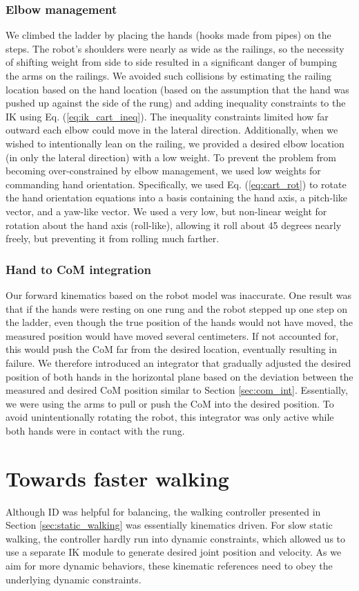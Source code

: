\documentclass{ws-ijhr}
\newcommand{\eref}[1] {Eq. (\ref{#1})}
\newcommand{\sref}[1] {Section \ref{#1}}
\begin{document}
\subsubsection{Elbow management}
We climbed the ladder by placing the hands (hooks made from pipes) on the steps.
The robot's shoulders were nearly as wide as the railings, so the necessity of 
shifting weight from side to side resulted in a significant danger of bumping 
the arms on the railings. 
We avoided such collisions by estimating the railing location based on the hand
location (based on the assumption that the hand was pushed up against the side
of the rung) and adding inequality constraints to the IK using \eref{eq:ik_cart_ineq}. 
The inequality constraints limited how far outward each elbow could move in the 
lateral direction. 
Additionally, when we wished to intentionally lean on the railing, we provided 
a desired elbow location (in only the lateral direction) with a low weight. 
To prevent the problem from becoming over-constrained by elbow management, we 
used low weights for commanding hand orientation. 
Specifically, we used \eref{eq:cart_rot} to rotate the hand orientation equations
into a basis containing the hand axis, a pitch-like vector, and a yaw-like vector.
We used a very low, but non-linear weight for rotation about the hand axis 
(roll-like), allowing it roll about 45 degrees nearly freely, but preventing it 
from rolling much farther.

\subsubsection{Hand to CoM integration}
Our forward kinematics based on the robot model was inaccurate. 
One result was that if the hands were resting on one rung and the robot stepped
up one step on the ladder, even though the true position of the hands would not
have moved, the measured position would have moved several centimeters. 
If not accounted for, this would push the CoM far from the desired location, 
eventually resulting in failure. 
We therefore introduced an integrator that gradually adjusted the desired position
of both hands in the horizontal plane based on the deviation between the measured 
and desired CoM position similar to \sref{sec:com_int}. 
Essentially, we were using the arms to pull or push the CoM into the desired 
position. 
To avoid unintentionally rotating the robot, this integrator was only active 
while both hands were in contact with the rung. 

\section{Towards faster walking}
\label{sec:new_stuff}
Although ID was helpful for balancing, the walking controller presented in 
\sref{sec:static_walking} was essentially kinematics driven. 
For slow static walking, the controller hardly run into dynamic constraints, 
which allowed us to use a separate IK module to generate desired joint 
position and velocity. 
As we aim for more dynamic behaviors, these kinematic references need to obey
the underlying dynamic constraints. 
\end{document}
